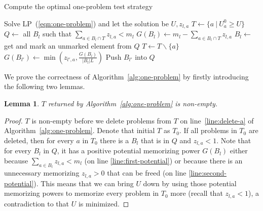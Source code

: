 \documentclass{article}
\newtheorem{lemma}{Lemma}
\begin{document}
\begin{algorithm}
\caption{Compute the optimal one-problem test strategy}\label{alg:one-problem}
\begin{algorithmic}[1]
	\State Solve LP~(\ref{eqn:one-problem}) and let the solution be $U, z_{l,a}$
	\State $T \gets \{a ~|~ U^0_a \geq U\}$
	\State $Q \gets $ all $B_l$ such that $\sum_{a \in B_l \cap T} z_{l,a} < m_l$
	 
		\State $G(B_l) \gets m_l-\sum_{a \in B_l \cap T} z_{l,a}$ \label{line:first-potential}
	\EndFor
		\State $B_l \gets $ get and mark an unmarked element from $Q$
			\State $T \gets T \backslash \{a\}$\label{line:delete-a}
				\State $G(B_{l'}) \gets \min(z_{l',a}, \frac{G(B_l)}{|B_l|L})$\label{line:second-potential}
				\State Push $B_{l'}$ into $Q$\label{line:second-push}
			\EndFor
		\EndFor
	\EndWhile
	\State {}
\EndFunction
\end{algorithmic}
\end{algorithm}

We prove the correctness of Algorithm~\ref{alg:one-problem} by firstly introducing the
following two lemmas.

\begin{lemma}\label{lemma:non-empty}
$T$ returned by Algorithm~\ref{alg:one-problem} is non-empty.
\end{lemma}
\begin{proof}
$T$ is non-empty before we delete problems from $T$ on line~\ref{line:delete-a}
of Algorithm~\ref{alg:one-problem}.  Denote that initial $T$ as $T_0$.  If all
problems in $T_0$ are deleted, then for every $a$ in $T_0$ there is a $B_l$
that is in $Q$ and $z_{l,a} < 1$.  Note that for every $B_l$ in $Q$, it has a
positive potential memorizing power $G(B_l)$ either because $\sum_{a \in B_l}
z_{l,a} < m_l$ (on line \ref{line:first-potential}) or because there is an
unnecessary memorizing $z_{l, a} > 0$ that can be freed (on line
\ref{line:second-potential}). This means that we can bring $U$ down by using
those potential memorizing powers to memorize every problem in $T_0$ more
(recall that $z_{l,a} < 1$), a contradiction to that $U$ is minimized.
\end{proof}
\end{document}
